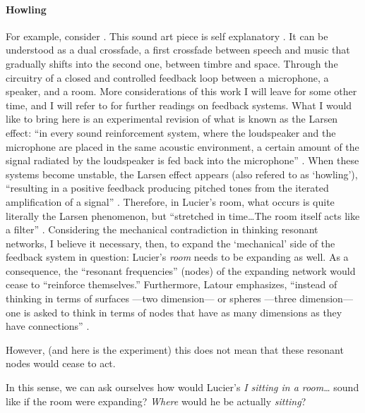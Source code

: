\paragraph{Howling}
For example, consider  . This sound art piece is self explanatory . It can be understood as a dual crossfade, a first crossfade between speech and music that gradually shifts into the second one, between timbre and space. Through the circuitry of a closed and controlled feedback loop between a microphone, a speaker, and a room. More considerations of this work I will leave for some other time, and I will refer to \textcite{icmc/bbp2372.2012.006} for further readings on feedback systems. What I would like to bring here is an experimental revision of what is known as the Larsen effect: ``in every sound reinforcement system, where the loudspeaker and the microphone are placed in the same acoustic environment, a certain amount of the signal radiated by the loudspeaker is fed back into the microphone'' \parencite[11]{Kro11:Aco}. When these systems become unstable, the Larsen effect appears (also refered to as `howling'), ``resulting in a positive feedback producing pitched tones from the iterated amplification of a signal'' \parencite[31]{icmc/bbp2372.2012.006}. Therefore, in Lucier's room, what occurs is quite literally the Larsen phenomenon, but ``stretched in time\dots The room itself acts like a filter'' \parencite[34]{icmc/bbp2372.2012.006}. Considering the mechanical contradiction in thinking resonant networks, I believe it necessary, then, to expand the `mechanical' side of the feedback system in question: Lucier's \textit{room} needs to be expanding as well. As a consequence, the ``resonant frequencies'' (nodes) of the expanding network would cease to ``reinforce themselves.'' Furthermore, Latour emphasizes, ``instead of thinking in terms of surfaces ---two dimension--- or spheres ---three dimension--- one is asked to think in terms of nodes that have as many dimensions as they have connections'' \parencite[3]{Lat90:On}. 

However, (and here is the experiment) this does not mean that these resonant nodes would cease to act. 

In this sense, we can ask ourselves how would Lucier's \textit{I sitting in a room\dots} sound like if the room were expanding? \textit{Where} would he be actually \textit{sitting}?

